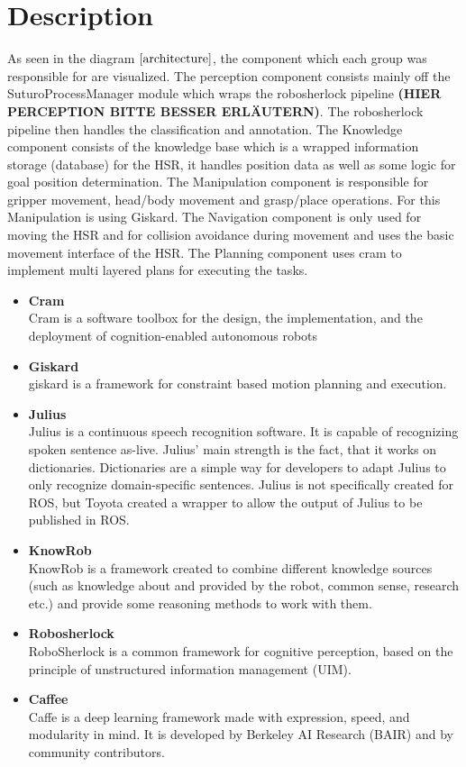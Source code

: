 \documentclass[main.tex]{subfiles}
\begin{document}
		\section{Description}
			As seen in the diagram \(\ref{architecture}\), the component which each group was responsible for are visualized. The perception component consists mainly off the SuturoProcessManager module which wraps the robosherlock pipeline \textbf{(HIER PERCEPTION BITTE BESSER ERLÄUTERN)}. The robosherlock pipeline then handles the classification and annotation. The Knowledge component consists of the knowledge base which is a wrapped information storage (database) for the HSR, it handles position data as well as some logic for goal position determination. The Manipulation component is responsible for gripper movement, head/body movement and grasp/place operations. For this Manipulation is using Giskard. The Navigation component is only used for moving the HSR and for collision avoidance during movement and uses the basic movement interface of the HSR. The Planning component uses cram to implement multi layered plans for executing the tasks.
			\begin{itemize}
				\item{\textbf{Cram}} \\
					 Cram is a software toolbox for the design, the implementation, and the deployment of cognition-enabled autonomous robots
				\item{\textbf{Giskard}} \\
					giskard is a  framework for constraint based motion planning and execution.
				\item{\textbf{Julius}} \\
					Julius is a continuous speech recognition software. It is capable of recognizing spoken sentence as-live. Julius' main strength is the fact, that it works on dictionaries. Dictionaries are a simple way for developers to adapt Julius to only recognize domain-specific sentences. Julius is not specifically created for ROS, but Toyota created a wrapper to allow the output of Julius to be published in ROS.
				\item{\textbf{KnowRob}} \\
				    KnowRob is a framework created to combine different knowledge sources (such as knowledge about and provided by the robot, common sense, research etc.) and provide some reasoning methods to work with them. 
				\item{\textbf{Robosherlock}} \\
					RoboSherlock is a common framework for cognitive perception, based on the principle of unstructured information management (UIM).
				\item{\textbf{Caffee}} \\
					Caffe is a deep learning framework made with expression, speed, and modularity in mind. It is developed by Berkeley AI Research (BAIR) and by community contributors.

			\end{itemize}
	  		 

	\endgroup
\end{document}
